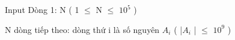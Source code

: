 Input
Dòng 1: N ( 1  $\le$  N  $\le$  $10^{5}$   )  

   N dòng tiếp theo: dòng thứ  i  là số nguyên  $A_{i}$   ( |$A_{i}$   |  $\le$  $10^{9}$   )